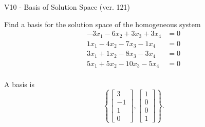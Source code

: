 \begin{exercise}
  \begin{exerciseTitle}V10 - Basis of Solution Space (ver. 121)\end{exerciseTitle}
  \begin{exerciseStatement}
    Find a basis for the solution space of the homogeneous system 
\begin{align*}
 -3 x_ 1 -6 x_ 2 + 3 x_ 3 + 3 x_ 4 &= 0  \\ 
  1 x_ 1 -4 x_ 2 -7 x_ 3 -1 x_ 4 &= 0  \\ 
  3 x_ 1 + 1 x_ 2 -8 x_ 3 -3 x_ 4 &= 0  \\ 
  5 x_ 1 + 5 x_ 2 -10 x_ 3 -5 x_ 4 &= 0  \\ 
 \end{align*}


 
  \end{exerciseStatement}

  \begin{exerciseAnswer}
   A basis is   
\[\left\{\left[\begin{array}{c}
3 \\
-1 \\
1 \\
0
\end{array}\right] , \left[\begin{array}{c}
1 \\
0 \\
0 \\
1
\end{array}\right]\right\}.\]

  


  \end{exerciseAnswer}
\end{exercise}